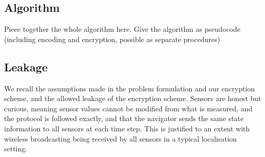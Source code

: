 \documentclass[twocolumn]{autart}
\begin{document}
% 
% 

\subsection{Algorithm}
Piece together the whole algorithm here.
Give the algorithm as pseudocode (including encoding and encryption, possible as separate procedures)




% 
% 

\subsection{Leakage} \label{subsec:leakage}
We recall the assumptions made in the problem formulation and our encryption scheme, and the allowed leakage of the encryption scheme. Sensors are honest but curious, meaning sensor values cannot be modified from what is measured, and the protocol is followed exactly, and that the navigator sends the same state information to all sensors at each time step. This is justified to an extent with wireless broadcasting being received by all sensors in a typical localisation setting.
\end{document}
